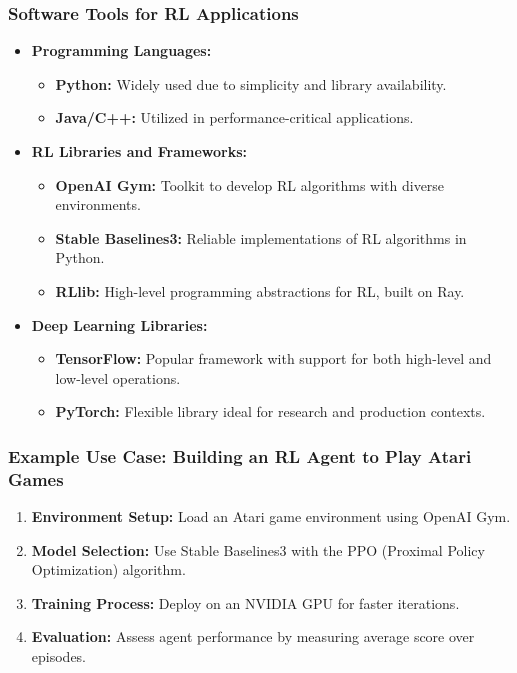 \documentclass[aspectratio=169]{beamer}
\begin{document}
\begin{frame}[fragile]
    \frametitle{Software Tools for RL Applications}
    \begin{itemize}
        \item \textbf{Programming Languages:}
        \begin{itemize}
            \item \textbf{Python:} Widely used due to simplicity and library availability.
            \item \textbf{Java/C++:} Utilized in performance-critical applications.
        \end{itemize}
        
        \item \textbf{RL Libraries and Frameworks:}
        \begin{itemize}
            \item \textbf{OpenAI Gym:} Toolkit to develop RL algorithms with diverse environments.
            \item \textbf{Stable Baselines3:} Reliable implementations of RL algorithms in Python.
            \item \textbf{RLlib:} High-level programming abstractions for RL, built on Ray.
        \end{itemize}

        \item \textbf{Deep Learning Libraries:}
        \begin{itemize}
            \item \textbf{TensorFlow:} Popular framework with support for both high-level and low-level operations.
            \item \textbf{PyTorch:} Flexible library ideal for research and production contexts.
        \end{itemize}
    \end{itemize}
\end{frame}

\begin{frame}[fragile]
    \frametitle{Example Use Case: Building an RL Agent to Play Atari Games}
    \begin{enumerate}
        \item \textbf{Environment Setup:} Load an Atari game environment using OpenAI Gym.
        \item \textbf{Model Selection:} Use Stable Baselines3 with the PPO (Proximal Policy Optimization) algorithm.
        \item \textbf{Training Process:} Deploy on an NVIDIA GPU for faster iterations.
        \item \textbf{Evaluation:} Assess agent performance by measuring average score over episodes.
    \end{enumerate}
\end{frame}
\end{document}
